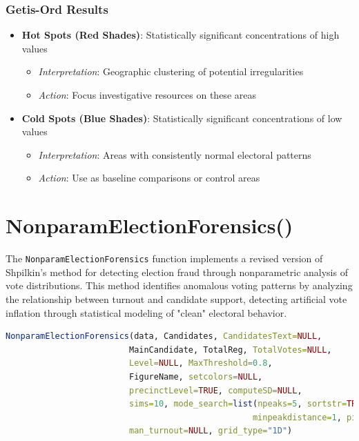 \documentclass{article}
\begin{document}
\subsubsection{Getis-Ord Results}
\begin{itemize}
    \item \textbf{Hot Spots (Red Shades)}: Statistically significant concentrations of high values
    \begin{itemize}
        \item \textit{Interpretation}: Geographic clustering of potential irregularities
        \item \textit{Action}: Focus investigative resources on these areas
    \end{itemize}
    
    \item \textbf{Cold Spots (Blue Shades)}: Statistically significant concentrations of low values
    \begin{itemize}
        \item \textit{Interpretation}: Areas with consistently normal electoral patterns
        \item \textit{Action}: Use as baseline comparisons or control areas
    \end{itemize}
\end{itemize}

\section{NonparamElectionForensics()}

The \texttt{NonparamElectionForensics} function implements a revised version of Shpilkin's method for detecting election fraud through nonparametric analysis of vote distributions. This method identifies anomalous voting patterns by analyzing the relationship between turnout and candidate support, detecting artificial vote inflation through statistical modeling of "clean" electoral behavior.

\begin{lstlisting}[language=R]
NonparamElectionForensics(data, Candidates, CandidatesText=NULL,
                         MainCandidate, TotalReg, TotalVotes=NULL,
                         Level=NULL, MaxThreshold=0.8,
                         FigureName, setcolors=NULL,
                         precinctLevel=TRUE, computeSD=NULL,
                         sims=10, mode_search=list(npeaks=5, sortstr=TRUE,
                                                  minpeakdistance=1, pick_by="height"),
                         man_turnout=NULL, grid_type="1D")
\end{lstlisting}
\end{document}

